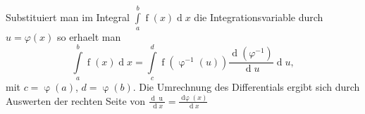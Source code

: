 Substituiert man im Integral $\int\limits_{a}^{b} \operatorname{f}(x) \operatorname{d}x$ die Integrationsvariable durch $u = \varphi(x)$ so erhaelt man
$$\int\limits_{a}^{b} \operatorname{f}(x) \operatorname{d}x = \int\limits_{c}^{d} \operatorname{f}(\operatorname{\varphi}^{-1}(u)) \frac{\operatorname{d}(\varphi^{-1})}{\operatorname{d}u} \operatorname{d}u,$$
mit $c = \operatorname{\varphi}(a)$, $d = \operatorname{\varphi}(b)$.
Die Umrechnung des Differentials ergibt sich durch Auswerten der rechten Seite von $\frac{\operatorname{d}\operatorname{u}}{\operatorname{d} x} = \frac{\operatorname{\operatorname{d} \varphi}(x)}{\operatorname{d}x}$ 		
